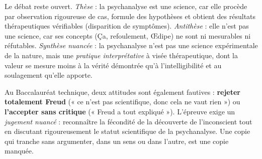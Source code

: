 \documentclass[11pt]{article}
\begin{document}
Le débat reste ouvert. \emph{Thèse} : la psychanalyse est une science, car elle procède par observation rigoureuse de cas, formule des hypothèses et obtient des résultats thérapeutiques vérifiables (disparition de symptômes). \emph{Antithèse} : elle n'est pas une science, car ses concepts (Ça, refoulement, Œdipe) ne sont ni mesurables ni réfutables. \emph{Synthèse nuancée} : la psychanalyse n'est pas une science expérimentale de la nature, mais une \emph{pratique interprétative} à visée thérapeutique, dont la valeur se mesure moins à la vérité démontrée qu'à l'intelligibilité et au soulagement qu'elle apporte.

\begin{attention}
Au Baccalauréat technique, deux attitudes sont également fautives : \textbf{rejeter totalement Freud} (« ce n'est pas scientifique, donc cela ne vaut rien ») ou \textbf{l'accepter sans critique} (« Freud a tout expliqué »). L'épreuve exige un \emph{jugement nuancé} : reconnaître la fécondité de la découverte de l'inconscient tout en discutant rigoureusement le statut scientifique de la psychanalyse. Une copie qui tranche sans argumenter, dans un sens ou dans l'autre, est une copie manquée.
\end{attention}
\end{document}
